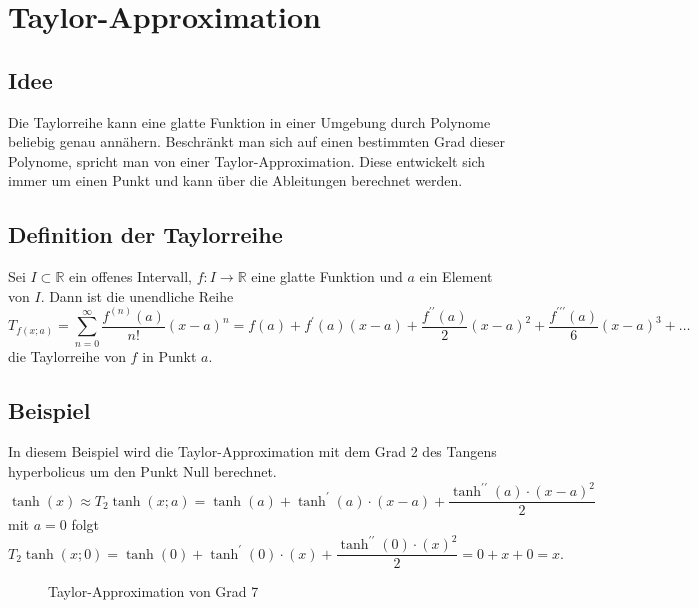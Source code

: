 %
%
%
\section{Taylor-Approximation
\label{transfer:section:teil1}}
\subsection{Idee}
Die Taylorreihe kann eine glatte Funktion in einer Umgebung durch Polynome beliebig genau annähern. Beschränkt man sich auf einen bestimmten Grad dieser Polynome, spricht man von einer Taylor-Approximation. Diese entwickelt sich immer um einen Punkt und kann über die Ableitungen berechnet werden.

\subsection{Definition der Taylorreihe}
Sei $I \subset \mathbb{R}$ ein offenes Intervall, $f: I \rightarrow \mathbb{R}$ eine glatte Funktion und $a$ ein Element von $I$. Dann ist die unendliche Reihe
\begin{equation}
	T_{f(x ; a)}=\sum_{n=0}^{\infty} \frac{f^{(n)}(a)}{n !}(x-a)^{n}=f(a)+f^{\prime}(a)(x-a)+\frac{f^{\prime \prime}(a)}{2}(x-a)^{2}+\frac{f^{\prime \prime \prime}(a)}{6}(x-a)^{3}+\ldots
\end{equation}
die Taylorreihe von $f$ in Punkt $a$.

\subsection{Beispiel}
In diesem Beispiel wird die Taylor-Approximation mit dem Grad 2 des Tangens hyperbolicus um den Punkt Null berechnet.
$$
	\tanh(x) \approx T_{2} \tanh(x ; a)=\tanh(a)+\tanh^{\prime}(a) \cdot(x-a)+\frac{\tanh^{\prime \prime}(a) \cdot(x-a)^{2}}{2}
$$
mit $a = 0$ folgt
$$
	T_{2} \tanh(x ; 0)=\tanh(0)+\tanh^{\prime}(0) \cdot(x)+\frac{\tanh^{\prime \prime}(0) \cdot(x)^{2}}{2} = 0 + x + 0 = x.
$$
\begin{figure}
\centering
{}
\caption{Taylor-Approximation von Grad 7
\label{motivation:figure:Taylor}}
\end{figure}

